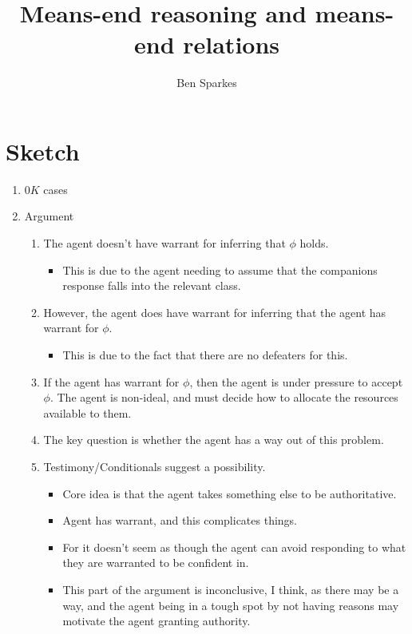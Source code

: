 \documentclass[10pt]{article}
\title{Means-end reasoning and means-end relations}
\author{Ben Sparkes}
\begin{document}
\section{Sketch}
\label{sec:sketch}

\begin{enumerate}
\item \(0K\) cases
\item Argument
  \begin{enumerate}
  \item The agent doesn't have warrant for inferring that \(\phi\) holds.
    \begin{itemize}
    \item This is due to the agent needing to assume that the companions response falls into the relevant class.
    \end{itemize}
  \item However, the agent does have warrant for inferring that the agent has warrant for \(\phi\).
    \begin{itemize}
    \item This is due to the fact that there are no defeaters for this.
    \end{itemize}
  \item If the agent has warrant for \(\phi\), then the agent is under pressure to accept \(\phi\).
    The agent is non-ideal, and must decide how to allocate the resources available to them.
  \item The key question is whether the agent has a way out of this problem.
  \item Testimony/Conditionals suggest a possibility.
    \begin{itemize}
    \item Core idea is that the agent takes something else to be authoritative.
    \item Agent has warrant, and this complicates things.
    \item For it doesn't seem as though the agent can avoid responding to what they are warranted to be confident in.
    \item This part of the argument is inconclusive, I think, as there may be a way, and the agent being in a tough spot by not having reasons may motivate the agent granting authority.
    \end{itemize}
  \end{enumerate}
\end{enumerate}




\newpage
\end{document}
